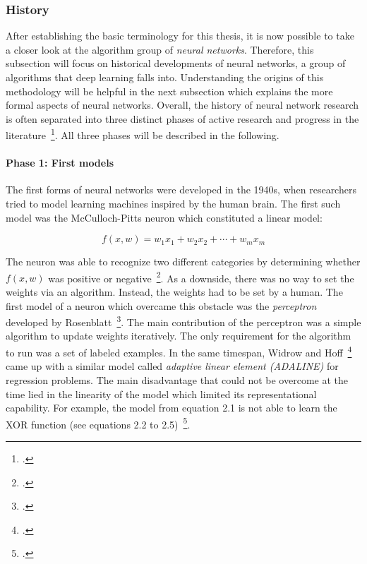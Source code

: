 \subsubsection{History}
\label{sub:dl_history}

After establishing the basic terminology for this thesis, 
it is now possible to take a closer look at the algorithm group of 
\textit{neural networks}. Therefore, this subsection will focus on historical
developments of neural networks, a group of algorithms that deep learning falls
into.
Understanding the origins of this methodology will be helpful in the next 
subsection which explains the more formal aspects of neural networks.
Overall, the history of neural network research is often separated into three
distinct phases of active research and progress in the literature~\footcite{Goodfellow2016}.
All three phases will be described in the following.

\paragraph{Phase 1: First models}

The first forms of neural networks were developed in the 1940s, when
researchers tried to model learning machines inspired by the human brain.
The first such model was the McCulloch-Pitts neuron which constituted a linear
model:

\begin{equation}
  f (x, w) = w_1 x_1 + w_2 x_2 + \cdots + w_m x_m
\end{equation}

The neuron was able to recognize two different categories by determining
whether $f(x, w)$ was positive or negative~\footcite{McCulloch1943}.
As a downside, there was no way to set the weights via an algorithm.
Instead, the weights had to be set by a human.
The first model of a neuron which overcame this obstacle was the \textit{perceptron}
developed by Rosenblatt~\footcite{Rosenblatt1958}. The main contribution of the
perceptron was a simple algorithm to update weights iteratively.
The only requirement for the algorithm to run was a set of labeled examples.
In the same timespan, Widrow and Hoff~\footcite{Widrow1960} came up with a similar
model called \textit{adaptive linear element (ADALINE)} for regression problems.
The main disadvantage that could not be overcome at the time lied in the 
linearity of the model which limited its representational capability.
For example, the model from equation 2.1 is not able to learn the XOR function 
(see equations 2.2 to 2.5)~\footcite{Minsky1969}.


